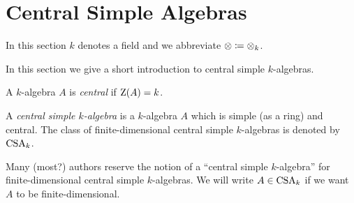 \section{Central Simple Algebras}


\begin{conventions}
  In this section $k$ denotes a field and we abbreviate $\mathbin{\otimes} \coloneqq \mathbin{\otimes}_k$.
\end{conventions}


\begin{fluff}
  In this section we give a short introduction to central simple $k$-algebras.
\end{fluff}


\begin{definition}
  A $k$-algebra $A$ is \emph{central} if $\operatorname{Z}(A) = k$.
\end{definition}


\begin{definition}
  A \emph{central simple $k$-algebra} is a $k$-algebra $A$ which is simple (as a ring) and central.
  The class of finite-dimensional central simple $k$-algebras is denoted by $\operatorname{CSA}_k$.
\end{definition}


\begin{remark}
  Many (most?) authors reserve the notion of a \enquote{central simple $k$-algebra} for finite-dimensional central simple $k$-algebras.
  We will write $A \in \operatorname{CSA}_k$ if we want $A$ to be finite-dimensional.
\end{remark}












